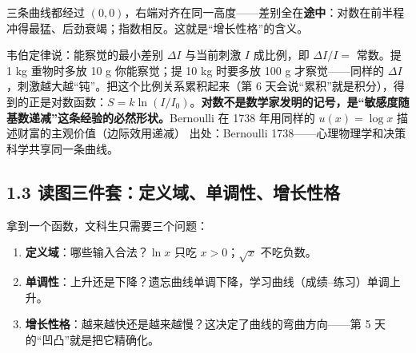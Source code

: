 \documentclass[UTF8,a4paper,11pt]{ctexart}
\newcommand{\src}[1]{%
  {\small\colorbox{refbg}{\color{refaccent}出处：#1}}}
\begin{document}
\begin{center}
\end{center}

三条曲线都经过 $(0,0)$，右端对齐在同一高度——差别全在\textbf{途中}：对数在前半程冲得最猛、后劲衰竭；指数相反。这就是“增长性格”的含义。

\begin{keyconcept}
韦伯定律说：能察觉的最小差别 $\Delta I$ 与当前刺激 $I$ 成比例，即 $\Delta I / I = $ 常数。提 1 kg 重物时多放 10 g 你能察觉；提 10 kg 时要多放 100 g 才察觉——同样的 $\Delta I$，刺激越大越“钝”。把这个比例关系累积起来（第 6 天会说“累积”就是积分），得到的正是对数函数：$S = k\ln(I/I_0)$。\textbf{对数不是数学家发明的记号，是“敏感度随基数递减”这条经验的必然形状。}Bernoulli 在 1738 年用同样的 $u(x)=\log x$ 描述财富的主观价值（边际效用递减）\src{Bernoulli 1738}——心理物理学和决策科学共享同一条曲线。
\end{keyconcept}

\subsection*{1.3 读图三件套：定义域、单调性、增长性格}

拿到一个函数，文科生只需要三个问题：

\begin{enumerate}
  \item \textbf{定义域}：哪些输入合法？$\ln x$ 只吃 $x>0$；$\sqrt{x}$ 不吃负数。
  \item \textbf{单调性}：上升还是下降？遗忘曲线单调下降，学习曲线（成绩–练习）单调上升。
  \item \textbf{增长性格}：越来越快还是越来越慢？这决定了曲线的弯曲方向——第 5 天的“凹凸”就是把它精确化。
\end{enumerate}
\end{document}
